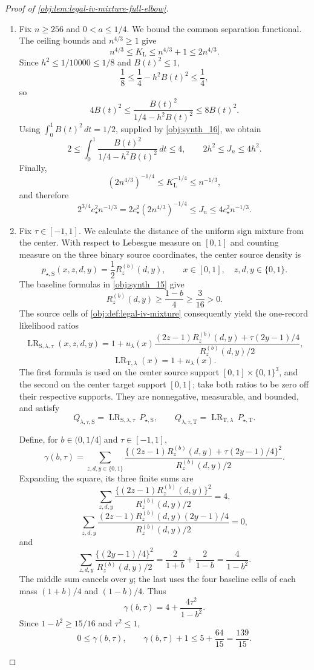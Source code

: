 \begin{proof}[Proof of \cref{obj:lem:legal-iv-mixture-full-elbow}]
\begin{enumerate}
\item
Fix \(n\ge256\) and \(0<a\le1/4\). We bound the common separation functional. The ceiling bounds and \(n^{4/3}\ge1\) give
\[
n^{4/3}\le K_{\mathrm L}
\le n^{4/3}+1\le2n^{4/3}.
\]
Since \(h^2\le1/10000\le1/8\) and \(B(t)^2\le1\),
\[
\frac18\le\frac14-h^2B(t)^2\le\frac14,
\]
so
\[
4B(t)^2
\le\frac{B(t)^2}{1/4-h^2B(t)^2}
\le8B(t)^2.
\]
Using \(\int_0^1B(t)^2\,dt=1/2\), supplied by \cref{obj:synth_16}, we obtain
\[
2
\le\int_0^1\frac{B(t)^2}{1/4-h^2B(t)^2}\,dt
\le4,
\qquad
2h^2\le J_n\le4h^2.
\]
Finally,
\[
(2n^{4/3})^{-1/4}
\le K_{\mathrm L}^{-1/4}\le n^{-1/3},
\]
and therefore
\[
2^{3/4}c_{\star}^2n^{-1/3}
=
2c_{\star}^2(2n^{4/3})^{-1/4}
\le J_n
\le4c_{\star}^2n^{-1/3}.
\]

\item
Fix \(\tau\in[-1,1]\). We calculate the distance of the uniform sign mixture from the center. With respect to Lebesgue measure on \([0,1]\) and counting measure on the three binary source coordinates, the center source density is
\[
p_{\star,\mathrm S}(x,z,d,y)
=\frac12R_z^{(b)}(d,y),
\qquad
x\in[0,1],\quad z,d,y\in\{0,1\}.
\]
The baseline formulas in \cref{obj:synth_15} give
\[
R_z^{(b)}(d,y)\ge\frac{1-b}{4}\ge\frac3{16}>0.
\]
The source cells of \cref{obj:def:legal-iv-mixture} consequently yield the one-record likelihood ratios
\[
\operatorname{LR}_{\mathrm S,\lambda,\tau}(x,z,d,y)
=
1+
u_{\lambda}(x)
\frac{(2z-1)R_z^{(b)}(d,y)+\tau(2y-1)/4}
{R_z^{(b)}(d,y)/2},
\]
\[
\operatorname{LR}_{\mathrm T,\lambda}(x)=1+u_{\lambda}(x).
\]
The first formula is used on the center source support
\([0,1]\times\{0,1\}^3\), and the second on the center target support \([0,1]\); take both ratios to be zero off their respective supports. They are nonnegative, measurable, and bounded, and satisfy
\[
Q_{\lambda,\tau,\mathrm S}
=
\operatorname{LR}_{\mathrm S,\lambda,\tau}\,P_{\star,\mathrm S},
\qquad
Q_{\lambda,\tau,\mathrm T}
=
\operatorname{LR}_{\mathrm T,\lambda}\,P_{\star,\mathrm T}.
\]

Define, for \(b\in(0,1/4]\) and \(\tau\in[-1,1]\),
\[
\gamma(b,\tau)
=
\sum_{z,d,y\in\{0,1\}}
\frac{\{(2z-1)R_z^{(b)}(d,y)+\tau(2y-1)/4\}^2}
{R_z^{(b)}(d,y)/2}.
\]
Expanding the square, its three finite sums are
\[
\sum_{z,d,y}
\frac{\{(2z-1)R_z^{(b)}(d,y)\}^2}{R_z^{(b)}(d,y)/2}
=4,
\]
\[
\sum_{z,d,y}
\frac{(2z-1)R_z^{(b)}(d,y)(2y-1)/4}
{R_z^{(b)}(d,y)/2}
=0,
\]
and
\[
\sum_{z,d,y}
\frac{\{(2y-1)/4\}^2}{R_z^{(b)}(d,y)/2}
=
\frac2{1+b}+\frac2{1-b}
=\frac4{1-b^2}.
\]
The middle sum cancels over \(y\); the last uses the four baseline cells of each mass \((1+b)/4\) and \((1-b)/4\). Thus
\[
\gamma(b,\tau)=4+\frac{4\tau^2}{1-b^2}.
\]
Since \(1-b^2\ge15/16\) and \(\tau^2\le1\),
\[
0\le\gamma(b,\tau),
\qquad
\gamma(b,\tau)+1
\le5+\frac{64}{15}=\frac{139}{15}.
\]


\end{enumerate}
\end{proof}
